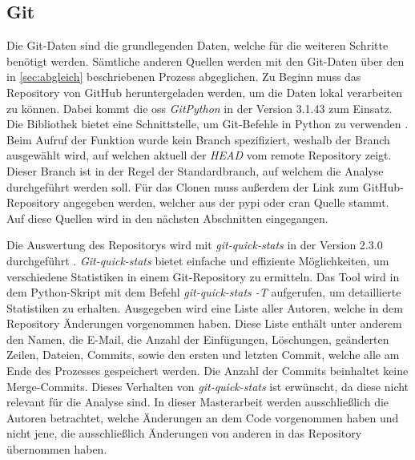 \subsection{Git}
\label{subsec:datenbeschaffung_git}
Die Git-Daten sind die grundlegenden Daten, welche für die weiteren Schritte benötigt werden.
Sämtliche anderen Quellen werden mit den Git-Daten über den in \autoref{sec:abgleich} beschriebenen Prozess abgeglichen.
Zu Beginn muss das Repository von GitHub heruntergeladen werden, um die Daten lokal verarbeiten zu können.
Dabei kommt die \gls{oss} \emph{GitPython} in der Version 3.1.43 zum Einsatz.
Die Bibliothek bietet eine Schnittstelle, um Git-Befehle in Python zu verwenden \autocite{thiel_gitpython_2024}.
Beim Aufruf der Funktion wurde kein Branch spezifiziert, weshalb der Branch ausgewählt wird, auf welchen aktuell der \emph{HEAD} vom remote Repository zeigt.
Dieser Branch ist in der Regel der Standardbranch, auf welchem die Analyse durchgeführt werden soll.
Für das Clonen muss außerdem der Link zum GitHub-Repository angegeben werden, welcher aus der \gls{pypi} oder \gls{cran} Quelle stammt.
Auf diese Quellen wird in den nächsten Abschnitten eingegangen.

Die Auswertung des Repositorys wird mit \emph{git-quick-stats} in der Version 2.3.0 durchgeführt \autocite{arzzen_git-quick-stats_2021}.
\emph{Git-quick-stats} bietet einfache und effiziente Möglichkeiten, um verschiedene Statistiken in einem Git-Repository zu ermitteln.
Das Tool wird in dem Python-Skript mit dem Befehl \emph{git-quick-stats -T} aufgerufen, um detaillierte Statistiken zu erhalten.
Ausgegeben wird eine Liste aller Autoren, welche in dem Repository Änderungen vorgenommen haben.
Diese Liste enthält unter anderem den Namen, die E-Mail, die Anzahl der Einfügungen, Löschungen, geänderten Zeilen, Dateien, Commits, sowie den ersten und letzten Commit, welche alle am Ende des Prozesses gespeichert werden.
Die Anzahl der Commits beinhaltet keine Merge-Commits.
Dieses Verhalten von \emph{git-quick-stats} ist erwünscht, da diese nicht relevant für die Analyse sind.
In dieser Masterarbeit werden ausschließlich die Autoren betrachtet, welche Änderungen an dem Code vorgenommen haben und nicht jene, die ausschließlich Änderungen von anderen in das Repository übernommen haben.

